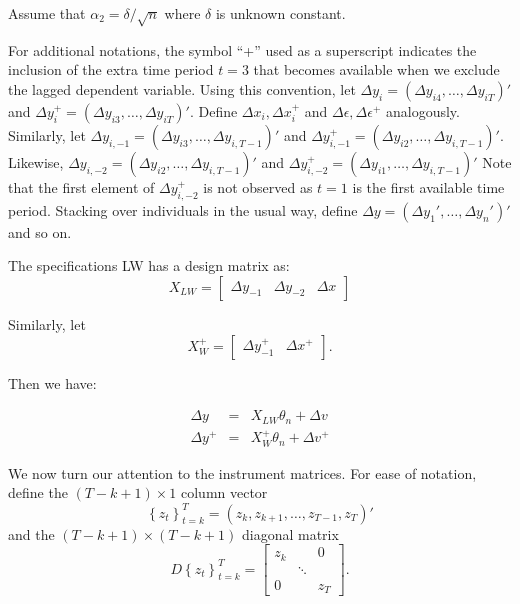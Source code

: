 \begin{assump}
Assume that $\alpha_2 = \delta/\sqrt{n}$ where $\delta$ is unknown constant.\\
\end{assump}

For additional notations, the symbol ``+'' used as a superscript indicates the inclusion of the extra time period $t=3$ that becomes available when we exclude the lagged dependent variable.
Using this convention, let $\Delta y_i = \left( \Delta y_{i4}, \hdots, \Delta y_{iT} \right)'$ and  $\Delta y_i^+ = \left( \Delta y_{i3},  \hdots, \Delta y_{iT} \right)'$.
Define $\Delta x_i, \Delta x_i^+$ and $\Delta \epsilon, \Delta \epsilon^+$ analogously. 
Similarly, let $\Delta y_{i,-1}=\left(\Delta y_{i3}, \hdots, \Delta y_{i,T-1}\right)'$ and $\Delta y_{i,-1}^+=\left(\Delta y_{i2}, \hdots, \Delta y_{i,T-1}\right)'$. Likewise, $\Delta y_{i,-2}=\left(\Delta y_{i2}, \hdots, \Delta y_{i,T-1}\right)'$ and $\Delta y_{i,-2}^+=\left(\Delta y_{i1}, \hdots, \Delta y_{i,T-1}\right)'$
Note that the first element of $\Delta y_{i,-2}^+$ is not observed as $t=1$ is the first available time period. 
Stacking over individuals in the usual way, define $\Delta y = \left( \Delta y_1', \hdots, \Delta y_n'\right)'$  and so on.

The specifications LW has a design matrix as:
	\begin{equation}
	X_{LW} = \left[\begin{array}{ccc}  \Delta y_{-1} & \Delta y_{-2} & \Delta x \end{array}\right]
	\end{equation}

Similarly, let
\begin{equation}
	X_W^+ = \left[ \begin{array}{cc}\Delta y_{-1}^+ & \Delta x^+ \end{array} \right].
\end{equation}

Then we have:

	\begin{eqnarray}
		\Delta y &=& X_{LW} \theta_n + \Delta v\\
		\label{eq:DGPplusSRvsLR}
		\Delta y^+ &=& X_W^+ \theta_n + \Delta v^+
	\end{eqnarray}

We now turn our attention to the instrument matrices. For ease of notation, define the $(T-k+1)\times 1$ column vector
	\begin{equation}
		\left\{ z_t\right\}_{t=k}^{T} = \left(z_k, z_{k+1}, \hdots, z_{T-1}, z_T \right)'
	\end{equation}
and the $(T-k+1)\times (T-k+1)$ diagonal matrix
\begin{equation}
		D\left\{ z_t \right\}_{t=k}^{T} = \left[\begin{array}{ccc} z_{k} & & 0\\ &\ddots&\\ 0 &&z_T \end{array}\right].
\end{equation}

